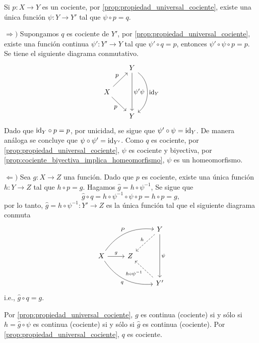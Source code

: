 \begin{dem}
    Si $p:X\to Y$ es un cociente, por \ref{prop:propiedad_universal_cociente}, existe una única función $\psi:Y\to Y'$ tal que $\psi\circ p=q$.
    
    $\Rightarrow)$ Supongamos $q$ es cociente de $Y'$, por \ref{prop:propiedad_universal_cociente}, existe una función continua $\psi':Y'\to Y$ tal que $\psi'\circ q=p$, entonces $\psi'\circ\psi\circ p=p$. Se tiene el siguiente diagrama conmutativo.
    \[
\begin{tikzcd}[every label/.append style = {font = \small},column sep=0.65cm, row sep=0.7cm]
   & Y \arrow[dd,"\psi'\psi"]  \arrow[dd,"\id_Y", bend left=55]\\
    X  \arrow[dr,"p"'] \arrow[ur,"p"] \\
   & Y 
\end{tikzcd}
\]
Dado que $\mathrm{id}_Y\circ p=p$, por unicidad, se sigue que $\psi'\circ\psi=\mathrm{id}_Y$. De manera análoga se concluye que $\psi\circ \psi'=\mathrm{id}_{Y'}$. Como $q$ es cociente, por \ref{prop:propiedad_universal_cociente}, $\psi$ es cociente y biyectiva, por \ref{prop:cociente_biyectiva_implica_homeomorfismo}, $\psi$ es un homeomorfismo.

$\Leftarrow)$ Sea $g:X\to Z$ una función. Dado que $p$ es cociente, existe una única función $h:Y\to Z$ tal que $h\circ p=g$. Hagamos $\hat{g}=h\circ\psi^{-1}$, Se sigue que
$$
\hat{g}\circ q=h\circ\psi^{-1}\circ\psi\circ p=h\circ p=g,
$$
por lo tanto, $\hat{g}=h\circ\psi^{-1}:Y'\to Z$ es la única función tal que el siguiente diagrama conmuta
\[
\begin{tikzcd}[row sep=5.5ex, column sep=0.85cm]
 & &Y \arrow[dd,"\psi"]  \arrow[dl,"h"',dashed]  \\
 X\arrow[r, "g"] \arrow[urr,bend left , "P"]   \arrow[drr,bend right, "q"'] & Z  & \\
  & & Y'  \arrow[ul, "h\circ\psi^{-1}", dashed]
\end{tikzcd}
\]    
i.e., $\hat{g}\circ q=g$. 

Por \ref{prop:propiedad_universal_cociente}, $g$ es continua (cociente) si y sólo si $h=\hat{g}\circ \psi$ es continua (cociente) si y sólo si $\hat{g}$ es continua (cociente). Por \ref{prop:propiedad_universal_cociente}, $q$ es cociente.
\end{dem}
